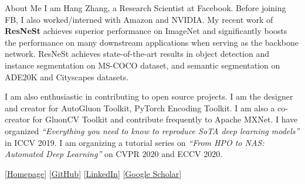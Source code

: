 \documentclass{resume} %
\begin{document}
\begin{rSection}{About Me}
I am Hang Zhang, a Research Scientist at Facebook. 
Before joining FB, I also worked/interned with Amazon and NVIDIA. 
My recent work of {\bf ResNeSt} achieves superior performance on ImageNet and significantly boosts the performance on many downstream applications when serving as the backbone network. ResNeSt achieves state-of-the-art results in object detection and instance segmentation on MS-COCO dataset, and semantic segmentation on ADE20K and Cityscapes datasets.

I am also enthusiastic in contributing to open source projects. I am the designer and creator for AutoGluon Toolkit, PyTorch Encoding Toolkit. I am also a co-creator for GluonCV Toolkit and contribute frequently to Apache MXNet. I have organized {\it ``Everything you need to know to reproduce SoTA deep learning models''} in ICCV 2019.
I am organizing a tutorial series on {\it``From HPO to NAS: Automated Deep Learning''} on CVPR 2020 and ECCV 2020. 


[\href{https://hangzhang.org/}{Homepage}] [\href{https://github.com/zhanghang1989}{GitHub}] 
[\href{https://www.linkedin.com/in/zhanghang0704}{LinkedIn}] 
[\href{https://scholar.google.com/citations?user=gCoWdkUAAAAJ}{Google Scholar}]
\end{rSection}


\newcommand{\RNum}[1]{\uppercase\expandafter{\romannumeral #1\relax}}
\end{document}
